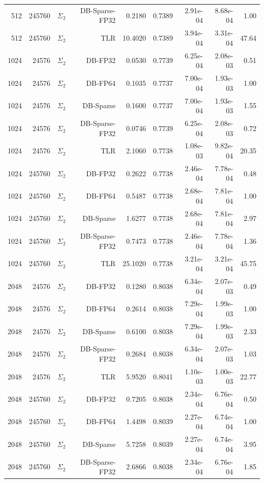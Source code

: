 \begin{tabular}{|r|r|r|r|r|r|r|r|r|}
  512 & 245760 & $\Sigma_2$ & DB-Sparse-FP32 & 0.2180 & 0.7389 & 2.91e-04 & 8.68e-04 & 1.00 \\
  512 & 245760 & $\Sigma_2$ & TLR & 10.4020 & 0.7389 & 3.94e-04 & 3.31e-04 & 47.64 \\
  1024 & 24576 & $\Sigma_2$ & DB-FP32 & 0.0530 & 0.7739 & 6.25e-04 & 2.08e-03 & 0.51 \\
  1024 & 24576 & $\Sigma_2$ & DB-FP64 & 0.1035 & 0.7737 & 7.00e-04 & 1.93e-03 & 1.00 \\
  1024 & 24576 & $\Sigma_2$ & DB-Sparse & 0.1600 & 0.7737 & 7.00e-04 & 1.93e-03 & 1.55 \\
  1024 & 24576 & $\Sigma_2$ & DB-Sparse-FP32 & 0.0746 & 0.7739 & 6.25e-04 & 2.08e-03 & 0.72 \\
  1024 & 24576 & $\Sigma_2$ & TLR & 2.1060 & 0.7738 & 1.08e-03 & 9.82e-04 & 20.35 \\
  1024 & 245760 & $\Sigma_2$ & DB-FP32 & 0.2622 & 0.7738 & 2.46e-04 & 7.78e-04 & 0.48 \\
  1024 & 245760 & $\Sigma_2$ & DB-FP64 & 0.5487 & 0.7738 & 2.68e-04 & 7.81e-04 & 1.00 \\
  1024 & 245760 & $\Sigma_2$ & DB-Sparse & 1.6277 & 0.7738 & 2.68e-04 & 7.81e-04 & 2.97 \\
  1024 & 245760 & $\Sigma_2$ & DB-Sparse-FP32 & 0.7473 & 0.7738 & 2.46e-04 & 7.78e-04 & 1.36 \\
  1024 & 245760 & $\Sigma_2$ & TLR & 25.1020 & 0.7738 & 3.21e-04 & 3.21e-04 & 45.75 \\
  2048 & 24576 & $\Sigma_2$ & DB-FP32 & 0.1280 & 0.8038 & 6.34e-04 & 2.07e-03 & 0.49 \\
  2048 & 24576 & $\Sigma_2$ & DB-FP64 & 0.2614 & 0.8038 & 7.29e-04 & 1.99e-03 & 1.00 \\
  2048 & 24576 & $\Sigma_2$ & DB-Sparse & 0.6100 & 0.8038 & 7.29e-04 & 1.99e-03 & 2.33 \\
  2048 & 24576 & $\Sigma_2$ & DB-Sparse-FP32 & 0.2684 & 0.8038 & 6.34e-04 & 2.07e-03 & 1.03 \\
  2048 & 24576 & $\Sigma_2$ & TLR & 5.9520 & 0.8041 & 1.10e-03 & 1.00e-03 & 22.77 \\
  2048 & 245760 & $\Sigma_2$ & DB-FP32 & 0.7205 & 0.8038 & 2.34e-04 & 6.76e-04 & 0.50 \\
  2048 & 245760 & $\Sigma_2$ & DB-FP64 & 1.4498 & 0.8039 & 2.27e-04 & 6.74e-04 & 1.00 \\
  2048 & 245760 & $\Sigma_2$ & DB-Sparse & 5.7258 & 0.8039 & 2.27e-04 & 6.74e-04 & 3.95 \\
  2048 & 245760 & $\Sigma_2$ & DB-Sparse-FP32 & 2.6866 & 0.8038 & 2.34e-04 & 6.76e-04 & 1.85 \\

\end{tabular}
